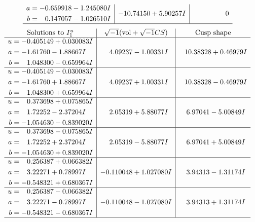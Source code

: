 \documentclass[1p]{elsarticle_modified}
\theoremstyle{definition}
\newcommand{\I}{\sqrt{-1}}
\begin{document}
$$\begin{array}{c|c|c}
\begin{aligned}
a &= -0.659918 - 1.245080 I \\
b &= \phantom{-}0.147057 - 1.026510 I\end{aligned}
 & -10.74150 + 5.90257 I & \phantom{-0.000000 } 0\\
 \hline 
 \end{array}$$\newpage$$\begin{array}{c|c|c}  
\text{Solutions to }I^u_{1}& \I (\text{vol} + \sqrt{-1}CS) & \text{Cusp shape}\\
 \hline 
\begin{aligned}
u &= -0.405149 + 0.030083 I \\
a &= -1.61760 - 1.88667 I \\
b &= \phantom{-}1.048300 - 0.659964 I\end{aligned}
 & \phantom{-}4.09237 - 1.00331 I & \phantom{-}10.38328 + 0.46979 I \\ \hline\begin{aligned}
u &= -0.405149 - 0.030083 I \\
a &= -1.61760 + 1.88667 I \\
b &= \phantom{-}1.048300 + 0.659964 I\end{aligned}
 & \phantom{-}4.09237 + 1.00331 I & \phantom{-}10.38328 - 0.46979 I \\ \hline\begin{aligned}
u &= \phantom{-}0.373698 + 0.075865 I \\
a &= \phantom{-}1.72252 - 2.37204 I \\
b &= -1.054630 - 0.839020 I\end{aligned}
 & \phantom{-}2.05319 + 5.88077 I & \phantom{-}6.97041 - 5.00849 I \\ \hline\begin{aligned}
u &= \phantom{-}0.373698 - 0.075865 I \\
a &= \phantom{-}1.72252 + 2.37204 I \\
b &= -1.054630 + 0.839020 I\end{aligned}
 & \phantom{-}2.05319 - 5.88077 I & \phantom{-}6.97041 + 5.00849 I \\ \hline\begin{aligned}
u &= \phantom{-}0.256387 + 0.066382 I \\
a &= \phantom{-}3.22271 + 0.78997 I \\
b &= -0.548321 + 0.680367 I\end{aligned}
 & -0.110048 + 1.027080 I & \phantom{-}3.94313 - 1.31174 I \\ \hline\begin{aligned}
u &= \phantom{-}0.256387 - 0.066382 I \\
a &= \phantom{-}3.22271 - 0.78997 I \\
b &= -0.548321 - 0.680367 I\end{aligned}
 & -0.110048 - 1.027080 I & \phantom{-}3.94313 + 1.31174 I\\
 \hline 
 \end{array}$$\newpage\newpage\renewcommand{\arraystretch}{1}
\end{document}

